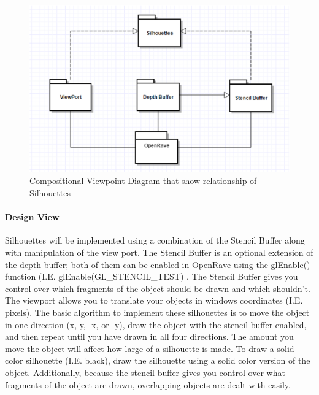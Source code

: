 \begin{flushleft}
\begin{figure} [H]
  \includegraphics[scale=0.9]{designdoc_v1/Silhouettes_composition.eps}
  \caption
{ \newline \hspace{\linewidth}
Compositional Viewpoint Diagram that show relationship of Silhouettes}
  \label{fig:Silhouettes_composition}
\end{figure}

\paragraph{Design View}
Silhouettes will be implemented using a combination of the Stencil Buffer along with manipulation of the view port.
The Stencil Buffer is an optional extension of the depth buffer; both of them can be enabled in OpenRave using the glEnable() function (I.E. glEnable(GL\_STENCIL\_TEST) \cite{depthstencils}.
The Stencil Buffer gives you control over which fragments of the object should be drawn and which shouldn’t.
The viewport allows you to translate your objects in windows coordinates (I.E. pixels).
The basic algorithm to implement these silhouettes is to move the object in one direction (x, y, -x, or -y), draw the object with the stencil buffer enabled, and then repeat until you have drawn in all four directions.
The amount you move the object will affect how large of a silhouette is made.
To draw a solid color silhouette (I.E. black), draw the silhouette using a solid color version of the object.
Additionally, because the stencil buffer gives you control over what fragments of the object are drawn, overlapping objects are dealt with easily.

\newpage


\end{flushleft}

